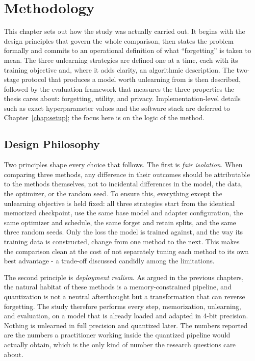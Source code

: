 \documentclass[a4paper,12pt]{report}
\begin{document}
\chapter{Methodology}
\label{chap:methodology}

This chapter sets out how the study was actually carried out. It begins with the design principles that govern the whole comparison, then states the problem formally and commits to an operational definition of what ``forgetting'' is taken to mean. The three unlearning strategies are defined one at a time, each with its training objective and, where it adds clarity, an algorithmic description. The two-stage protocol that produces a model worth unlearning from is then described, followed by the evaluation framework that measures the three properties the thesis cares about: forgetting, utility, and privacy. Implementation-level details such as exact hyperparameter values and the software stack are deferred to Chapter~\ref{chap:setup}; the focus here is on the logic of the method.

\section{Design Philosophy}
Two principles shape every choice that follows. The first is \emph{fair isolation}. When comparing three methods, any difference in their outcomes should be attributable to the methods themselves, not to incidental differences in the model, the data, the optimizer, or the random seed. To ensure this, everything except the unlearning objective is held fixed: all three strategies start from the identical memorized checkpoint, use the same base model and adapter configuration, the same optimizer and schedule, the same forget and retain splits, and the same three random seeds. Only the loss the model is trained against, and the way its training data is constructed, change from one method to the next. This makes the comparison clean at the cost of not separately tuning each method to its own best advantage - a trade-off discussed candidly among the limitations.

The second principle is \emph{deployment realism}. As argued in the previous chapters, the natural habitat of these methods is a memory-constrained pipeline, and quantization is not a neutral afterthought but a transformation that can reverse forgetting. The study therefore performs every step, memorization, unlearning, and evaluation, on a model that is already loaded and adapted in 4-bit precision. Nothing is unlearned in full precision and quantized later. The numbers reported are the numbers a practitioner working inside the quantized pipeline would actually obtain, which is the only kind of number the research questions care about.
\end{document}
